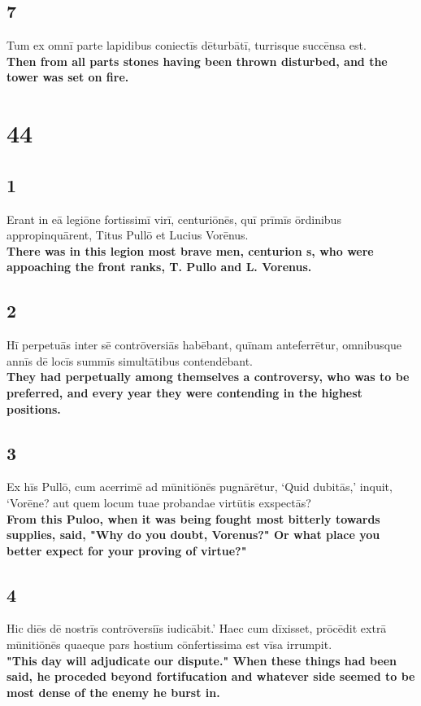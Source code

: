 \documentclass{article}
\begin{document}
\subsection*{7}
Tum ex omnī parte lapidibus coniectīs dēturbātī, turrisque succēnsa est.\\
\textbf{Then from all parts stones having been thrown disturbed, and the tower was set on fire.}



\section*{44}

\subsection*{1}
Erant in eā legiōne fortissimī virī, centuriōnēs, quī prīmīs ōrdinibus appropinquārent, Titus Pullō et Lucius Vorēnus. \\
\textbf{There was in this legion most brave men, centurion s, who were appoaching the front ranks, T. Pullo and L. Vorenus.}

\subsection*{2}
Hī perpetuās inter sē contrōversiās habēbant, quīnam anteferrētur, omnibusque annīs dē locīs summīs simultātibus contendēbant. \\
\textbf{They had perpetually among themselves a controversy, who was to be preferred, and every year they were contending in the highest positions.}

\subsection*{3}
Ex hīs Pullō, cum acerrimē ad mūnitiōnēs pugnārētur, ‘Quid dubitās,’ inquit, ‘Vorēne? aut quem locum tuae probandae virtūtis exspectās? \\
\textbf{From this Puloo, when it was being fought most bitterly towards supplies, said, "Why do you doubt, Vorenus?" Or what place you better expect for your proving of virtue?"}

\subsection*{4}
Hic diēs dē nostrīs contrōversiīs iudicābit.’ Haec cum dīxisset, prōcēdit extrā mūnitiōnēs quaeque pars hostium cōnfertissima est vīsa irrumpit. \\
\textbf{"This day will adjudicate our dispute." When these things had been said, he proceded beyond fortifucation and whatever side seemed to be most dense of the enemy he burst in. }
\end{document}
